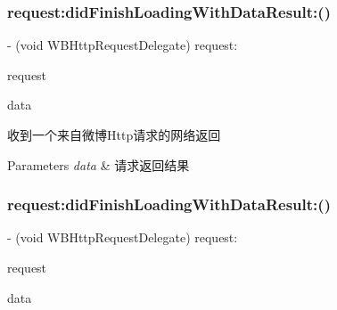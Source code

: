 \subsubsection{\texorpdfstring{request\+:did\+Finish\+Loading\+With\+Data\+Result\+:()}{request:didFinishLoadingWithDataResult:()}\hspace{0.1cm}{\footnotesize\ttfamily [2/3]}}
{\footnotesize\ttfamily -\/ (void W\+B\+Http\+Request\+Delegate) request\+: \begin{DoxyParamCaption}\item[{(\mbox{\hyperlink{interface_w_b_http_request}{W\+B\+Http\+Request}} $\ast$)}]{request }\item[{didFinishLoadingWithDataResult:(N\+S\+Data $\ast$)}]{data }\end{DoxyParamCaption}\hspace{0.3cm}{\ttfamily [optional]}}

收到一个来自微博\+Http请求的网络返回


\begin{DoxyParams}{Parameters}
{\em data} & 请求返回结果 \\
\hline
\end{DoxyParams}
\mbox{\label{protocol_w_b_http_request_delegate_01-p_adb2c6d41767770c8c9b965a02b4789c2}} 
\subsubsection{\texorpdfstring{request\+:did\+Finish\+Loading\+With\+Data\+Result\+:()}{request:didFinishLoadingWithDataResult:()}\hspace{0.1cm}{\footnotesize\ttfamily [3/3]}}
{\footnotesize\ttfamily -\/ (void W\+B\+Http\+Request\+Delegate) request\+: \begin{DoxyParamCaption}\item[{(\mbox{\hyperlink{interface_w_b_http_request}{W\+B\+Http\+Request}} $\ast$)}]{request }\item[{didFinishLoadingWithDataResult:(N\+S\+Data $\ast$)}]{data }\end{DoxyParamCaption}\hspace{0.3cm}{\ttfamily [optional]}}

